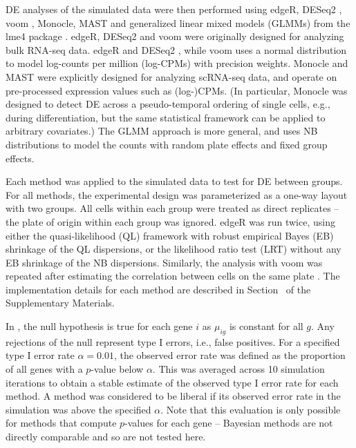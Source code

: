 \documentclass[oupdraft]{bio}
\begin{document}
DE analyses of the simulated data were then performed using edgeR, DESeq2 \citep{love2014moderated}, voom \citep{law2014voom}, Monocle, MAST \citep{finak2015mast} and generalized linear mixed models (GLMMs) from the lme4 package \citep{bates2015fitting}.
edgeR, DESeq2 and voom were originally designed for analyzing bulk RNA-seq data.
edgeR and DESeq2 , while voom uses a normal distribution to model log-counts per million (log-CPMs) with precision weights.
Monocle and MAST were explicitly designed for analyzing scRNA-seq data, and operate on pre-processed expression values such as (log-)CPMs.
(In particular, Monocle was designed to detect DE across a pseudo-temporal ordering of single cells, e.g., during differentiation, but the same statistical framework can be applied to arbitrary covariates.)
The GLMM approach is more general, and uses NB distributions to model the counts with random plate effects and fixed group effects.

Each method was applied to the simulated data to test for DE between groups. 
For all methods, the experimental design was parameterized as a one-way layout with two groups.
All cells within each group were treated as direct replicates -- the plate of origin within each group was ignored.
edgeR was run twice, using either the quasi-likelihood (QL) framework \citep{lund2012detecting} with robust empirical Bayes (EB) shrinkage \citep{phipson2016robust} of the QL dispersions,
    or the likelihood ratio test (LRT) \citep{mccarthy2012differential} without any EB shrinkage of the NB dispersions.
Similarly, the analysis with voom was repeated after estimating the correlation between cells on the same plate \citep{smyth2005use}.
The implementation details for each method are described in Section~\suppimplementation{} of the Supplementary Materials.

In , the null hypothesis is true for each gene $i$ as $\mu_{ig}$ is constant for all $g$.
Any rejections of the null represent type I errors, i.e., false positives.
For a specified type I error rate $\alpha = 0.01$, the observed error rate was defined as the proportion of all genes with a $p$-value below $\alpha$.
This was averaged across 10 simulation iterations to obtain a stable estimate of the observed type I error rate for each method. 
A method was considered to be liberal if its observed error rate in the simulation was above the specified $\alpha$.
Note that this evaluation is only possible for methods that compute $p$-values for each gene -- 
    Bayesian methods \citep{vallejos2016beyond,kharchenko2014bayesian} are not directly comparable and so are not tested here.
\end{document}

